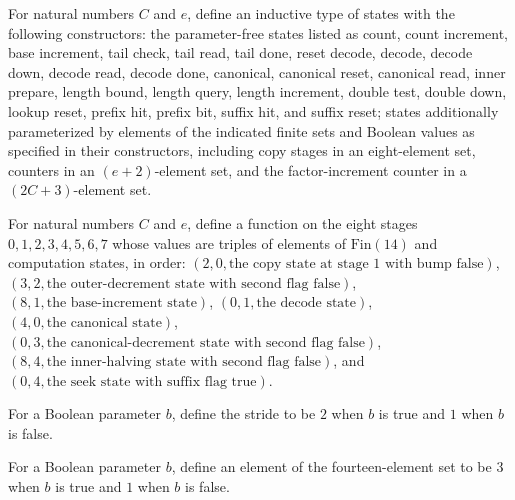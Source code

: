 \begin{definition}
\label{Complexity.CompState}
\leanok
For natural numbers $C$ and $e$, define an inductive type of states with the following
constructors: the parameter-free states listed as count, count increment, base
increment, tail check, tail read, tail done, reset decode, decode, decode down, decode
read, decode done, canonical, canonical reset, canonical read, inner prepare, length
bound, length query, length increment, double test, double down, lookup reset, prefix
hit, prefix bit, suffix hit, and suffix reset; states additionally parameterized by
elements of the indicated finite sets and Boolean values as specified in their
constructors, including copy stages in an eight-element set, counters in an
$(e+2)$-element set, and the factor-increment counter in a $(2C+3)$-element set.
\end{definition}

\begin{definition}
\label{Complexity.compCopy}
\leanok
{}
For natural numbers $C$ and $e$, define a function on the eight stages $0,1,2,3,4,5,6,7$
whose values are triples of elements of $\text{Fin}(14)$ and computation states, in
order: $(2,0,\text{the copy state at stage }1\text{ with bump false})$, $(3,2,\text{the
outer-decrement state with second flag false})$, $(8,1,\text{the base-increment state})$,
$(0,1,\text{the decode state})$, $(4,0,\text{the canonical state})$, $(0,3,\text{the
canonical-decrement state with second flag false})$, $(8,4,\text{the inner-halving state
with second flag false})$, and $(0,4,\text{the seek state with suffix flag true})$.
\end{definition}

\begin{definition}
\label{Complexity.compStride}
\leanok
For a Boolean parameter $b$, define the stride to be $2$ when $b$ is true and $1$ when
$b$ is false.
\end{definition}

\begin{definition}
\label{Complexity.compLimit}
\leanok
For a Boolean parameter $b$, define an element of the fourteen-element set to be $3$
when $b$ is true and $1$ when $b$ is false.
\end{definition}

